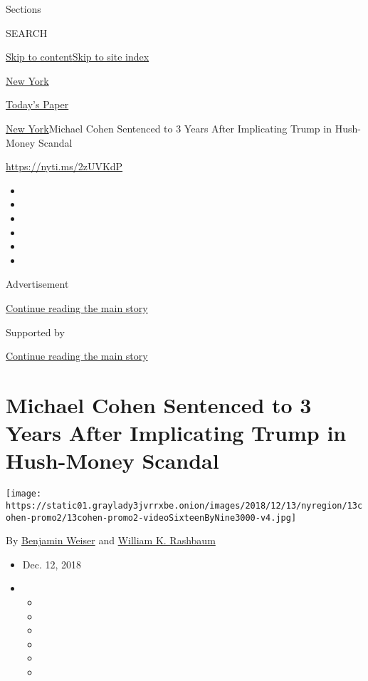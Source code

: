Sections

SEARCH

\protect\hyperlink{site-content}{Skip to
content}\protect\hyperlink{site-index}{Skip to site index}

\href{https://www.nytimes3xbfgragh.onion/section/nyregion}{New York}

\href{https://myaccount.nytimes3xbfgragh.onion/auth/login?response_type=cookie\&client_id=vi}{}

\href{https://www.nytimes3xbfgragh.onion/section/todayspaper}{Today's
Paper}

\href{/section/nyregion}{New York}\textbar{}Michael Cohen Sentenced to 3
Years After Implicating Trump in Hush-Money Scandal

\url{https://nyti.ms/2zUVKdP}

\begin{itemize}
\item
\item
\item
\item
\item
\item
\end{itemize}

Advertisement

\protect\hyperlink{after-top}{Continue reading the main story}

Supported by

\protect\hyperlink{after-sponsor}{Continue reading the main story}

\hypertarget{michael-cohen-sentenced-to-3-years-after-implicating-trump-in-hush-money-scandal}{%
\section{Michael Cohen Sentenced to 3 Years After Implicating Trump in
Hush-Money
Scandal}\label{michael-cohen-sentenced-to-3-years-after-implicating-trump-in-hush-money-scandal}}

\texttt{[image: https://static01.graylady3jvrrxbe.onion/images/2018/12/13/nyregion/13cohen-promo2/13cohen-promo2-videoSixteenByNine3000-v4.jpg]}

By \href{https://www.nytimes3xbfgragh.onion/by/benjamin-weiser}{Benjamin
Weiser} and
\href{https://www.nytimes3xbfgragh.onion/by/william-k-rashbaum}{William
K. Rashbaum}

\begin{itemize}
\item
  Dec. 12, 2018
\item
  \begin{itemize}
  \item
  \item
  \item
  \item
  \item
  \item
  \end{itemize}
\end{itemize}

